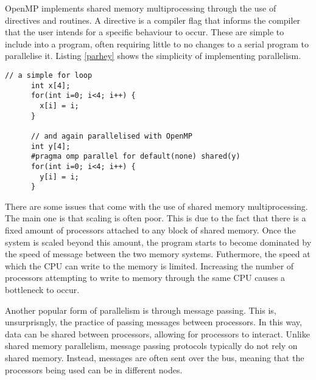 \documentclass[../main.tex]{subfiles}
\begin{document}
    OpenMP implements shared memory multiprocessing through the use of directives and routines.
    A directive is a compiler flag that informs the compiler that the user intends for a specific behaviour to occur.
    These are simple to include into a program, often requiring little to no changes to a serial program to parallelise it.
    Listing \ref{parhey} shows the simplicity of implementing parallelism.
    \lstset{language=C++}
    \begin{lstlisting}[caption = 'A simple loop parallelised with OpenMP', label=parhey]
      // a simple for loop
      int x[4];
      for(int i=0; i<4; i++) {
        x[i] = i;
      }

      // and again parallelised with OpenMP
      int y[4];
      #pragma omp parallel for default(none) shared(y)
      for(int i=0; i<4; i++) {
        y[i] = i;
      }
    \end{lstlisting}

    There are some issues that come with the use of shared memory multiprocessing.
    The main one is that scaling is often poor.
    This is due to the fact that there is a fixed amount of processors attached to any block of shared memory.
    Once the system is scaled beyond this amount, the program starts to become dominated by the speed of message between the two memory systems.
    Futhermore, the speed at which the CPU can write to the memory is limited.
    Increasing the number of processors attempting to write to memory through the same CPU causes a bottleneck to occur.

    Another popular form of parallelism is through message passing.
    This is, unsurprisngly, the practice of passing messages between processors.
    In this way, data can be shared between processors, allowing for processors to interact.
    Unlike shared memory parallelism, message passing protocols typically do not rely on shared memory.
    Instead, messages are often sent over the bus, meaning that the processors being used can be in different nodes.
\end{document}
